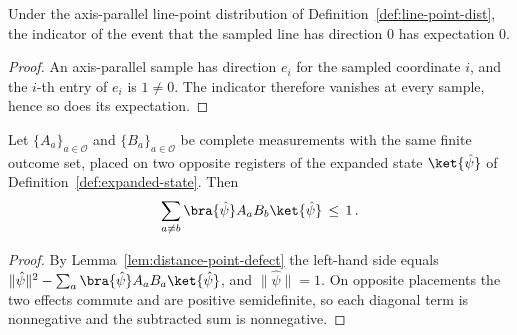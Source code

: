 \begin{lemma}
	\label{lem:axis-line-zero-direction-mass}
	\leanok
	Under the axis-parallel line-point distribution of
	Definition~\ref{def:line-point-dist}, the indicator of the event that the
	sampled line has direction $0$ has expectation $0$.
\end{lemma}
\begin{proof}
	\leanok
	An axis-parallel sample has direction $e_i$ for the sampled coordinate
	$i$, and the $i$-th entry of $e_i$ is $1 \ne 0$. The indicator therefore
	vanishes at every sample, hence so does its expectation.
\end{proof}

\begin{lemma}
	\label{lem:consistency-defect-integrand-le-one}
	\leanok
	Let $\{A_a\}_{a \in \mathcal{O}}$ and $\{B_a\}_{a \in \mathcal{O}}$ be
	complete measurements with the same finite outcome set, placed on two
	opposite registers of the expanded state $\ket{\hat\psi}$ of
	Definition~\ref{def:expanded-state}. Then
	\[
		\sum_{a \ne b} \bra{\hat\psi} A_a B_b \ket{\hat\psi} \,\le\, 1\,.
	\]
\end{lemma}
\begin{proof}
	\leanok
	By Lemma~\ref{lem:distance-point-defect} the left-hand side equals
	$\|\hat\psi\|^2-\sum_a \bra{\hat\psi} A_a B_a \ket{\hat\psi}$, and
	$\|\hat\psi\|=1$. On opposite placements the two effects commute and are
	positive semidefinite, so each diagonal term is nonnegative and the
	subtracted sum is nonnegative.
\end{proof}

